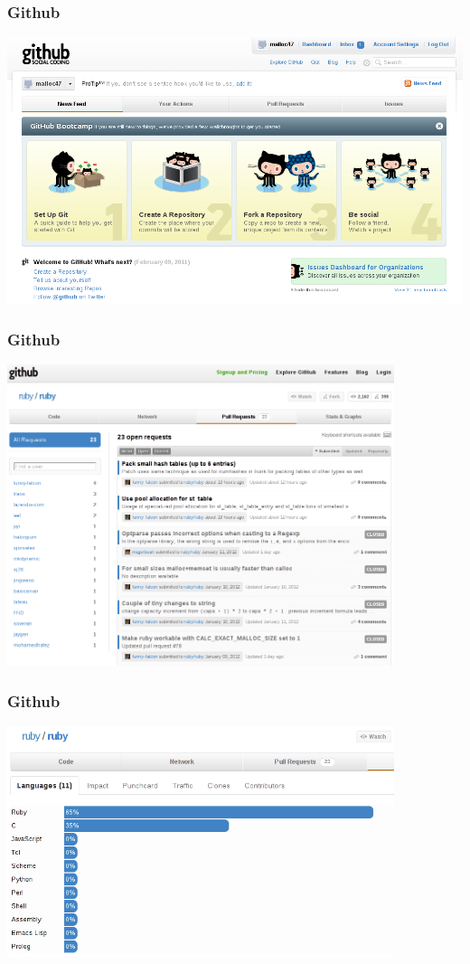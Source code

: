 \documentclass{beamer}
\begin{document}
\begin{frame}
  \frametitle{Github}
  \begin{center} \includegraphics[width=1\textwidth]{../img/github-screenshot} \end{center}
\end{frame}

\begin{frame}
  \frametitle{Github}
  \begin{center} \includegraphics[width=0.85\textwidth]{../img/github-ruby} \end{center}
\end{frame}

\begin{frame}
  \frametitle{Github}
  \begin{center} \includegraphics[width=0.85\textwidth]{../img/ruby-breakdown} \end{center}
\end{frame}
\end{document}
